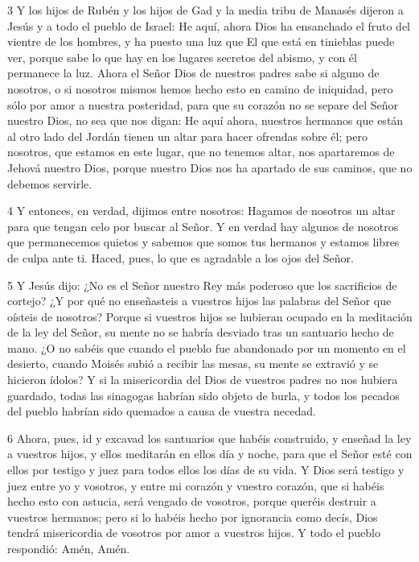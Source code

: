 \par 3 Y los hijos de Rubén y los hijos de Gad y la media tribu de Manasés dijeron a Jesús y a todo el pueblo de Israel: He aquí, ahora Dios ha ensanchado el fruto del vientre de los hombres, y ha puesto una luz que El que está en tinieblas puede ver, porque sabe lo que hay en los lugares secretos del abismo, y con él permanece la luz. Ahora el Señor Dios de nuestros padres sabe si alguno de nosotros, o si nosotros mismos hemos hecho esto en camino de iniquidad, pero sólo por amor a nuestra posteridad, para que su corazón no se separe del Señor nuestro Dios, no sea que nos digan: He aquí ahora, nuestros hermanos que están al otro lado del Jordán tienen un altar para hacer ofrendas sobre él; pero nosotros, que estamos en este lugar, que no tenemos altar, nos apartaremos de Jehová nuestro Dios, porque nuestro Dios nos ha apartado de sus caminos, que no debemos servirle.

\par 4 Y entonces, en verdad, dijimos entre nosotros: Hagamos de nosotros un altar para que tengan celo por buscar al Señor. Y en verdad hay algunos de nosotros que permanecemos quietos y sabemos que somos tus hermanos y estamos libres de culpa ante ti. Haced, pues, lo que es agradable a los ojos del Señor.

\par 5 Y Jesús dijo: ¿No es el Señor nuestro Rey más poderoso que los sacrificios de cortejo? ¿Y por qué no enseñasteis a vuestros hijos las palabras del Señor que oísteis de nosotros? Porque si vuestros hijos se hubieran ocupado en la meditación de la ley del Señor, su mente no se habría desviado tras un santuario hecho de mano. ¿O no sabéis que cuando el pueblo fue abandonado por un momento en el desierto, cuando Moisés subió a recibir las mesas, su mente se extravió y se hicieron ídolos? Y si la misericordia del Dios de vuestros padres no nos hubiera guardado, todas las sinagogas habrían sido objeto de burla, y todos los pecados del pueblo habrían sido quemados a causa de vuestra necedad.

\par 6 Ahora, pues, id y excavad los santuarios que habéis construido, y enseñad la ley a vuestros hijos, y ellos meditarán en ellos día y noche, para que el Señor esté con ellos por testigo y juez para todos ellos los días de su vida. Y Dios será testigo y juez entre yo y vosotros, y entre mi corazón y vuestro corazón, que si habéis hecho esto con astucia, será vengado de vosotros, porque queréis destruir a vuestros hermanos; pero si lo habéis hecho por ignorancia como decís, Dios tendrá misericordia de vosotros por amor a vuestros hijos. Y todo el pueblo respondió: Amén, Amén.

